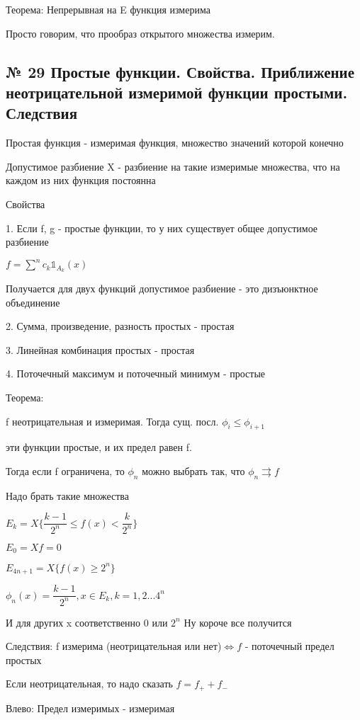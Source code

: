 \documentclass{article}
\begin{document}
Теорема: Непрерывная на E функция измерима

Просто говорим, что прообраз открытого множества измерим.

\subsection{ \footnotesize № 29 Простые функции. Свойства. Приближение неотрицательной измеримой функции простыми. Следствия}

Простая функция - измеримая функция, множество значений которой конечно

Допустимое разбиение X - разбиение на такие измеримые множества, что на каждом из них функция постоянна

Свойства

1. Если f, g - простые функции, то у них существует общее допустимое разбиение

$f = \sum\limits^n{c_k\mathbb{1}_{A_k}(x)}$

Получается для двух функций допустимое разбиение - это дизъюнктное объединение

2. Сумма, произведение, разность простых - простая

3. Линейная комбинация простых - простая

4. Поточечный максимум и поточечный минимум - простые

Теорема:

f неотрицательная и измеримая. Тогда сущ. посл. $\phi_i \leq \phi_{i + 1}$

эти функции простые, и их предел равен f.

Тогда если f ограничена, то $\phi_n$ можно выбрать так, что $\phi_n \rightrightarrows f$

Надо брать такие множества

$E_k = X\{\dfrac{k - 1}{2^n} \leq f(x) < \dfrac{k}{2^n}\}$

$E_0 = X{f = 0}$

$E_{4n + 1} = X\{f(x) \geq 2^n\}$

$\phi_n(x) = \dfrac{k - 1}{2^n}, x \in E_k, k = 1,2...4^n$

И для других x соответственно 0 или $2^n$ Ну короче все получится


Следствия: f измерима (неотрицательная или нет)$\Leftrightarrow f$ - поточечный предел простых

Если неотрицательная, то надо сказать $f = f_+ + f_-$

Влево: Предел измеримых - измеримая
\end{document}
